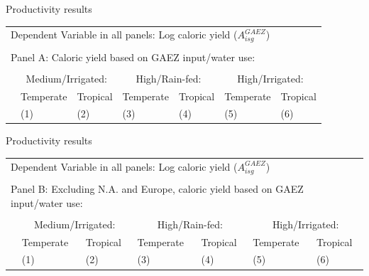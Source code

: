 \documentclass[10pt, xcolor=dvipsnames]{beamer}
\begin{document}
\begin{frame}{Productivity results}\label{prodreg}
{\footnotesize
\begin{tabularx}{\textwidth}{lXXXXXX}
\midrule
\multicolumn{7}{l}{Dependent Variable in all panels: Log caloric yield ($A^{GAEZ}_{isg}$)} \\ \\
\multicolumn{7}{l}{Panel A: Caloric yield based on GAEZ input/water use:} \\ \\
 & \multicolumn{2}{c}{Medium/Irrigated:} & \multicolumn{2}{c}{High/Rain-fed:} & \multicolumn{2}{c}{High/Irrigated:}\\ \cmidrule(lr){2-3} \cmidrule(lr){4-5} \cmidrule(lr){6-7} 
 & Temperate & Tropical & Temperate  & Tropical  & Temperate  & Tropical \\
 & (1) & (2) & (3) & (4) & (5) & (6) \\
\midrule

\midrule
\end{tabularx}
}

\hfill \hyperlink{prod}{}
\end{frame}

\begin{frame}{Productivity results}

{\footnotesize
\begin{tabularx}{\textwidth}{lXXXXXX}
\midrule
\multicolumn{7}{l}{Dependent Variable in all panels: Log caloric yield ($A^{GAEZ}_{isg}$)} \\ \\
\multicolumn{7}{l}{Panel B: Excluding N.A. and Europe, caloric yield based on GAEZ input/water use:} \\ \\
 & \multicolumn{2}{c}{Medium/Irrigated:} & \multicolumn{2}{c}{High/Rain-fed:} & \multicolumn{2}{c}{High/Irrigated:}\\ \cmidrule(lr){2-3} \cmidrule(lr){4-5} \cmidrule(lr){6-7} 
 & Temperate & Tropical & Temperate  & Tropical  & Temperate  & Tropical \\
 & (1) & (2) & (3) & (4) & (5) & (6) \\
\midrule

\midrule
\end{tabularx}
}

\end{frame}
\end{document}
